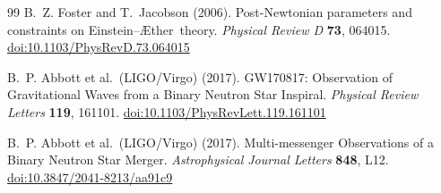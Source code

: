 \documentclass[12pt,a4paper]{article}
\providecommand{\doi}[1]{\href{https://doi.org/#1}{doi:#1}}
\newcommand{\Aether}{\AE ther}
\begin{document}
\begin{thebibliography}{99}
B.~Z. Foster and T.~Jacobson (2006).
\newblock Post-Newtonian parameters and constraints on Einstein--\Aether\
  theory.
\newblock \emph{Physical Review D} \textbf{73}, 064015.
\newblock \doi{10.1103/PhysRevD.73.064015}


B.~P. Abbott et al.\ (LIGO/Virgo) (2017).
\newblock GW170817: Observation of Gravitational Waves from a Binary Neutron
  Star Inspiral.
\newblock \emph{Physical Review Letters} \textbf{119}, 161101.
\newblock \doi{10.1103/PhysRevLett.119.161101}

B.~P. Abbott et al.\ (LIGO/Virgo) (2017).
\newblock Multi-messenger Observations of a Binary Neutron Star Merger.
\newblock \emph{Astrophysical Journal Letters} \textbf{848}, L12.
\newblock \doi{10.3847/2041-8213/aa91c9}

\end{thebibliography}
\end{document}
